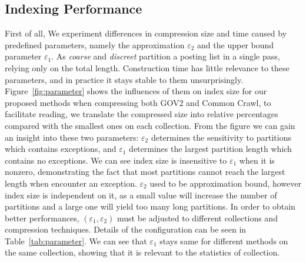 \documentclass[runningheads,a4paper]{llncs}
\begin{document}
\subsection{Indexing Performance}

First of all, We experiment differences in compression size and time caused by predefined parameters, namely the approximation $\varepsilon_{2}$ and the upper bound parameter $\varepsilon_{1}$.
As \textit{coarse} and \textit{discreet} partition a posting list in a single pass, relying only on the total length.
Construction time has little relevance to these parameters, and in practice it stays stable to them unsurprisingly.
Figure~\ref{fig:parameter} shows the influences of them on index size for our proposed methods when compressing both GOV2 and Common Crawl, to facilitate reading, we translate the compressed size into relative percentages compared with the smallest ones on each collection.
From the figure we can gain an insight into these two parameters: $\varepsilon_{2}$ determines the sensitivity to partitions which contains exceptions, and $\varepsilon_{1}$ determines the largest partition length which contains no exceptions.
We can see index size is insensitive to $\varepsilon_{1}$ when it is nonzero, demonstrating the fact that most partitions cannot reach the largest length when encounter an exception.
$\varepsilon_{2}$ used to be approximation bound, however index size is independent on it, as a small value will increase the number of partitions and a large one will yield too many long partitions.
In order to obtain better performances, $ \left( \varepsilon_1,\varepsilon_2 \right) $ must be adjusted to different collections and compression techniques.
Details of the configuration can be seen in Table~\ref{tab:parameter}.
We can see that $ \varepsilon_1 $ stays same for different methods on the same collection, showing that it is relevant to the statistics of collection.
\end{document}
